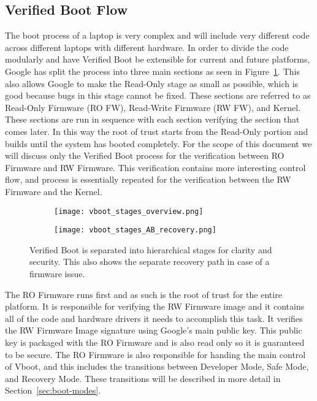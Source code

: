 \documentclass[../report.tex]{subfiles}
\begin{document}
\subsection{Verified Boot Flow}

The boot process of a laptop is very complex and will include very different code across different laptops with different hardware.
In order to divide the code modularly and have Verified Boot be extensible for current and future platforms, Google has split the process into three main sections as seen in Figure~\ref{fig:vboot_stages_overview}.
This also allows Google to make the Read-Only stage as small as possible, which is good because bugs in this stage cannot be fixed.
These sections are referred to as Read-Only Firmware (RO FW), Read-Write Firmware (RW FW), and Kernel.
These sections are run in sequence with each section verifying the section that comes later.
In this way the root of trust starts from the Read-Only portion and builds until the system has booted completely.
For the scope of this document we will discuss only the Verified Boot process for the verification between RO Firmware and RW Firmware. 
This verification contains more interesting control flow, and process is essentially repeated for the verification between the RW Firmware and the Kernel.

\begin{figure}
\begin{subfigure}{.4\textwidth}
  \centering
  \texttt{[image: vboot\_stages\_overview.png]}
\end{subfigure}
\begin{subfigure}{.60\textwidth}
  \centering
  \texttt{[image: vboot\_stages\_AB\_recovery.png]}
\end{subfigure}
\caption{Verified Boot is separated into hierarchical stages for clarity and security. This also shows the separate recovery path in case of a firmware issue.}
\label{fig:vboot_stages_overview}
\end{figure}

The RO Firmware runs first and as such is the root of trust for the entire platform.
It is responsible for verifying the RW Firmware image and it contains all of the code and hardware drivers it needs to accomplish this task.
It verifies the RW Firmware Image signature using Google's main public key.
This public key is packaged with the RO Firmware and is also read only so it is guaranteed to be secure.
The RO Firmware is also responsible for handing the main control of Vboot, and this includes the transitions between Developer Mode, Safe Mode, and Recovery Mode.
These transitions will be described in more detail in Section~\ref{sec:boot-modes}.
\end{document}
